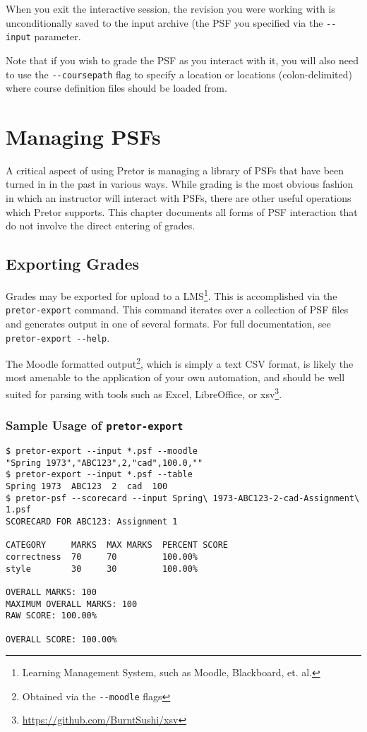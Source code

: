 \documentclass{book}
\begin{document}
When you exit the interactive session, the revision you were working with is
unconditionally saved to the input archive (the PSF you specified via the
\texttt{-{}-input} parameter.

Note that if you wish to grade the PSF as you interact with it, you will also
need to use the \texttt{-{}-coursepath} flag to specify a location or locations
(colon-delimited) where course definition files should be loaded from.

\chapter{Managing PSFs} %

A critical aspect of using Pretor is managing a library of PSFs that have been
turned in in the past in various ways. While grading is the most obvious
fashion in which an instructor will interact with PSFs, there are other useful
operations which Pretor supports. This chapter documents all forms of PSF
interaction that do not involve the direct entering of grades.

\section{Exporting Grades}

Grades may be exported for upload to a LMS\footnote{Learning Management System,
such as Moodle, Blackboard, et. al.}. This is accomplished via the
\texttt{pretor-export} command. This command iterates over a collection of PSF
files and generates output in one of several formats. For full documentation,
see \texttt{pretor-export -{}-help}.

The Moodle formatted output\footnote{Obtained via the \texttt{-{}-moodle}
flags}, which is simply a text CSV format, is likely the most amenable to the
application of your own automation, and should be well suited for parsing with
tools such as Excel, LibreOffice, or
xsv\footnote{\url{https://github.com/BurntSushi/xsv}}.

\subsection{Sample Usage of \texttt{pretor-export}}

\begin{verbatim}
$ pretor-export --input *.psf --moodle
"Spring 1973","ABC123",2,"cad",100.0,""
$ pretor-export --input *.psf --table
Spring 1973  ABC123  2  cad  100
$ pretor-psf --scorecard --input Spring\ 1973-ABC123-2-cad-Assignment\ 1.psf
SCORECARD FOR ABC123: Assignment 1

CATEGORY     MARKS  MAX MARKS  PERCENT SCORE
correctness  70     70         100.00%
style        30     30         100.00%

OVERALL MARKS: 100
MAXIMUM OVERALL MARKS: 100
RAW SCORE: 100.00%

OVERALL SCORE: 100.00%
\end{verbatim}
\end{document}
